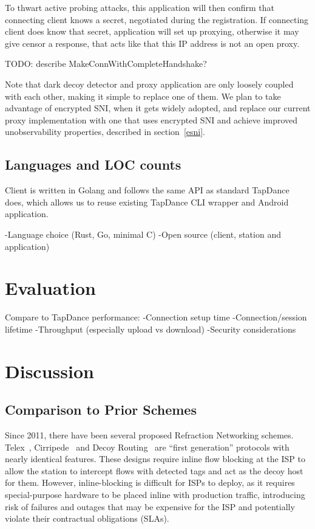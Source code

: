 \documentclass[letterpaper,twocolumn,10pt]{article}
\begin{document}
To thwart active probing attacks, this application will then confirm
that connecting client knows a secret, negotiated during the registration.
If connecting client does know that secret, application will set up proxying,
otherwise it may give censor a response, that acts like that this IP address
is not an open proxy.

TODO: describe MakeConnWithCompleteHandshake?

Note that dark decoy detector and proxy application are only loosely coupled with each other,
making it simple to replace one of them.
We plan to take advantage of encrypted SNI, when it gets widely adopted,
and replace our current proxy implementation with one that uses encrypted SNI
and achieve improved unobservability properties, described in section~\ref{esni}.

\subsection{Languages and LOC counts} %
Client is written in Golang and follows the same API as standard TapDance does,
which allows us to reuse existing TapDance CLI wrapper and Android application.

-Language choice (Rust, Go, minimal C)
-Open source (client, station and application)
\fi


\section{Evaluation}

Compare to TapDance performance:
-Connection setup time
-Connection/session lifetime
-Throughput (especially upload vs download)
-Security considerations


\section{Discussion}

\subsection{Comparison to Prior Schemes}

Since 2011, there have been several proposed Refraction Networking schemes.
Telex~\cite{telex}, Cirripede~\cite{cirripede} and Decoy
Routing~\cite{curveball} are ``first generation'' protocols with nearly
identical features. These designs require inline flow blocking at the ISP to
allow the station to intercept flows with detected tags and act as the decoy
host for them. However, inline-blocking is difficult for ISPs to deploy, as it
requires special-purpose hardware to be placed inline with production traffic,
introducing risk of failures and outages that may be expensive for the ISP
and potentially violate their contractual obligations (SLAs).
\end{document}
